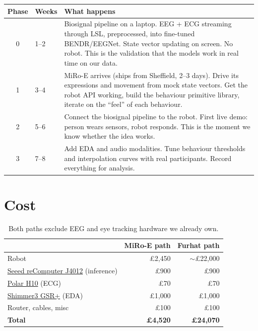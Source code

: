 \documentclass[11pt,a4paper]{article}
\begin{document}
\begin{table}[H]
\centering\small
\begin{tabularx}{\textwidth}{clX}
\toprule
\textbf{Phase} & \textbf{Weeks} & \textbf{What happens} \\
\midrule
0 & 1--2 & Biosignal pipeline on a laptop. EEG + ECG streaming through LSL, preprocessed, into fine-tuned BENDR/EEGNet. State vector updating on screen. No robot. This is the validation that the models work in real time on our data. \\
1 & 3--4 & MiRo-E arrives (ships from Sheffield, 2--3 days). Drive its expressions and movement from mock state vectors. Get the robot API working, build the behaviour primitive library, iterate on the ``feel'' of each behaviour. \\
2 & 5--6 & Connect the biosignal pipeline to the robot. First live demo: person wears sensors, robot responds. This is the moment we know whether the idea works. \\
3 & 7--8 & Add EDA and audio modalities. Tune behaviour thresholds and interpolation curves with real participants. Record everything for analysis. \\
\bottomrule
\end{tabularx}
\end{table}

\section{Cost}

\begin{table}[H]
\centering\small
\begin{tabular}{lrr}
\toprule
& \textbf{MiRo-E path} & \textbf{Furhat path} \\
\midrule
Robot & \pounds 2,450 & $\sim$\pounds 22,000 \\
\href{https://www.seeedstudio.com/reComputer-J4012-p-5586.html}{Seeed reComputer J4012} (inference) & \pounds 900 & \pounds 900 \\
\href{https://www.polar.com/uk-en/sensors/h10-heart-rate-sensor}{Polar H10} (ECG) & \pounds 70 & \pounds 70 \\
\href{https://shimmersensing.com/product/shimmer3-gsr-unit/}{Shimmer3 GSR+} (EDA) & \pounds 1,000 & \pounds 1,000 \\
Router, cables, misc & \pounds 100 & \pounds 100 \\
\midrule
\textbf{Total} & \textbf{\pounds 4,520} & \textbf{\pounds 24,070} \\
\bottomrule
\end{tabular}
\caption*{Both paths exclude EEG and eye tracking hardware we already own.}
\end{table}
\end{document}
